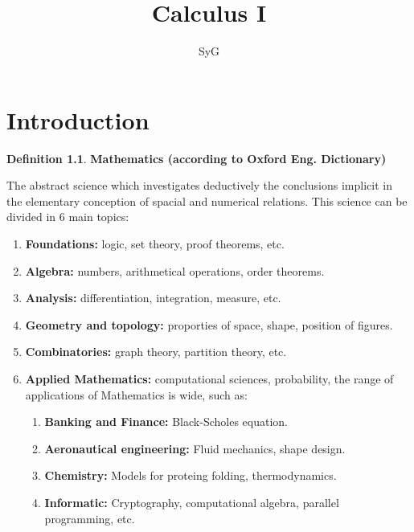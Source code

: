 \documentclass[12pt, a4paper]{book}
\begin{document}
\theoremstyle{plain}
\newtheorem{thm}{Theorem}[chapter]
\newtheorem{lem}[thm]{Lemma}
\newtheorem{prop}[thm]{Proposition}
\newtheorem*{cor}{Corollary}


\theoremstyle{definition}
\newtheorem{defn}[thm]{Definition}
\newtheorem{conj}{Conjecture}[section]
\newtheorem{exmp}[thm]{Example}

\theoremstyle{remark}
\newtheorem*{rem}{Remark}
\newtheorem*{note}{Note}


\title{Calculus I}
\author{SyG}
\maketitle


\chapter{Introduction}
\begin{defn} \textbf{Mathematics (according to Oxford Eng. Dictionary)} \end{defn}
The abstract science which investigates deductively the conclusions implicit in the 
elementary conception of spacial and numerical relations.
This science can be divided in 6 main topics:
\begin{enumerate}
  \item \textbf{Foundations:} logic, set theory, proof theorems, etc.
  \item \textbf{Algebra:} numbers, arithmetical operations, order theorems. 
  \item \textbf{Analysis:} differentiation, integration, measure, etc.
  \item \textbf{Geometry and topology:} proporties of space, shape, position of figures.
  \item \textbf{Combinatories:} graph theory, partition theory, etc.
  \item \textbf{Applied Mathematics:} computational sciences, probability, the range of applications
  of Mathematics is wide, such as:
  \begin{enumerate}
    \item \textbf{Banking and Finance:} Black-Scholes equation.
    \item \textbf{Aeronautical engineering:} Fluid mechanics, shape design.
    \item \textbf{Chemistry:} Models for proteing folding, thermodynamics.
    \item \textbf{Informatic:} Cryptography, computational algebra, parallel programming, etc. 
  \end{enumerate}
\end{enumerate}
\end{document}
